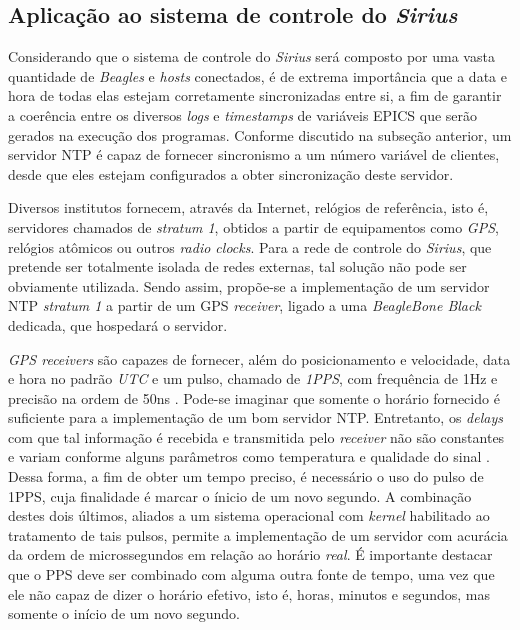 \FloatBarrier
\subsection {Aplicação ao sistema de controle do \textit{Sirius}}

Considerando que o sistema de controle do \textit{Sirius} será composto por uma
vasta quantidade de \textit{Beagles} e \textit{hosts} conectados, é de extrema
importância que a data e hora de todas elas estejam corretamente sincronizadas
entre si, a fim de garantir a coerência entre os diversos \textit{logs} e
\textit{timestamps} de variáveis EPICS que serão gerados na execução dos
programas. Conforme discutido na subseção anterior, um servidor NTP é capaz de
fornecer sincronismo a um número variável de clientes, desde que eles estejam
configurados a obter sincronização deste servidor.

\vspace{12pt}  

Diversos institutos fornecem, através da Internet, relógios de referência, isto
é, servidores chamados de \textit{stratum 1}, obtidos a partir de equipamentos
como \textit{GPS}, relógios atômicos ou outros \textit{radio clocks}. Para a rede
de controle do \textit{Sirius}, que pretende ser totalmente isolada de redes
externas, tal solução não pode ser obviamente utilizada. Sendo assim, propõe-se
a implementação de um servidor NTP \textit{stratum 1} a partir de um GPS
\textit{receiver}, ligado a uma \textit{BeagleBone Black} dedicada, que
hospedará o servidor.

\vspace{12pt}

\textit{GPS receivers} são capazes de fornecer, além do posicionamento e
velocidade, data e hora no padrão \textit{UTC} e um pulso, chamado de
\textit{1PPS}, com frequência de 1Hz e precisão na ordem de 50ns
\cite{gpsdhowto}. Pode-se imaginar que somente o horário fornecido é suficiente
para a implementação de um bom servidor NTP. Entretanto, os \textit{delays} com
que tal informação é recebida e transmitida pelo \textit{receiver} não são
constantes e variam conforme alguns parâmetros como temperatura e qualidade do
sinal \cite{rasp}. Dessa forma, a fim de obter um tempo preciso, é necessário o
uso do pulso de 1PPS, cuja finalidade é marcar o ínicio de um novo segundo. A combinação
destes dois últimos, aliados a um sistema operacional com \textit{kernel}
habilitado ao tratamento de tais pulsos, permite a implementação de um servidor
com acurácia da ordem de microssegundos em relação ao horário \textit{real}. É
importante destacar que o PPS deve ser combinado com alguma outra fonte de
tempo, uma vez que ele não capaz de dizer o horário efetivo, isto é, horas,
minutos e segundos, mas somente o início de um novo segundo.

